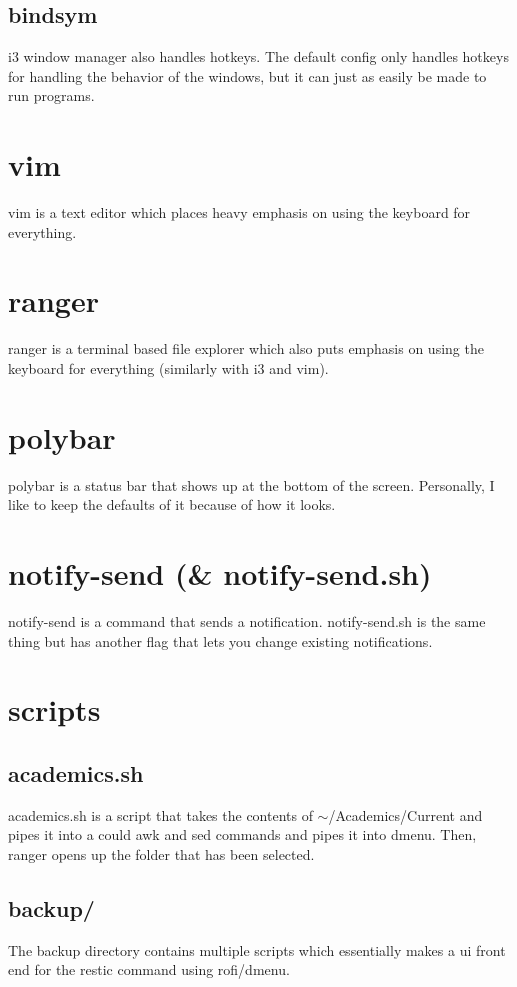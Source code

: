\documentclass[letterpaper,12pt]{article}
\begin{document}
\subsection{bindsym}
\par i3 window manager also handles hotkeys.
The default config only handles hotkeys for handling the behavior of the windows, but it can just as easily be made to run programs.
\section{vim}
\par vim is a text editor which places heavy emphasis on using the keyboard for everything.
\section{ranger}
\par ranger is a terminal based file explorer which also puts emphasis on using the keyboard for everything (similarly with i3 and vim).
\section{polybar}
\par polybar is a status bar that shows up at the bottom of the screen.
Personally, I like to keep the defaults of it because of how it looks.
\section{notify-send (\& notify-send.sh)}
\par notify-send is a command that sends a notification.
notify-send.sh is the same thing but has another flag that lets you change existing notifications.
\section{scripts}
\subsection{academics.sh}
\par academics.sh is a script that takes the contents of $\sim$/Academics/Current and pipes it into a could awk and sed commands and pipes it into dmenu.
Then, ranger opens up the folder that has been selected.
\subsection{backup/}
\par The backup directory contains multiple scripts which essentially makes a ui front end for the restic command using rofi/dmenu.
\end{document}
